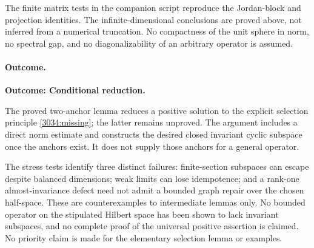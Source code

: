 \documentclass[11pt,a4paper]{article}
\numberwithin{equation}{section}
\begin{document}
The finite matrix tests in the companion script reproduce the Jordan-block
and projection identities. The infinite-dimensional conclusions are proved
above, not inferred from a numerical truncation. No compactness of the unit
sphere in norm, no spectral gap, and no diagonalizability of an arbitrary
operator is assumed.

\paragraph{Outcome.}
\textbf{Outcome: Conditional reduction.}

The proved two-anchor lemma reduces a positive solution to the explicit
selection principle \eqref{3034:missing}; the latter remains unproved.
The argument includes a direct norm estimate and constructs the desired
closed invariant cyclic subspace once the anchors exist. It does not
supply those anchors for a general operator.

The stress tests identify three distinct failures: finite-section subspaces
can escape despite balanced dimensions; weak limits can lose idempotence;
and a rank-one almost-invariance defect need not admit a bounded graph
repair over the chosen half-space. These are counterexamples to intermediate
lemmas only. No bounded operator on the stipulated Hilbert space has been
shown to lack invariant subspaces, and no complete proof of the universal
positive assertion is claimed. No priority claim is made for the elementary
selection lemma or examples.

\par{}
\end{document}
